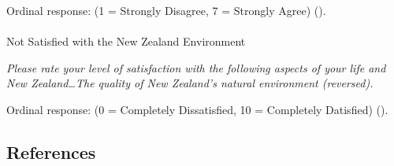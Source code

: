 \documentclass[
  single column]{article}
\makeatletter
\let\oldparagraph\paragraph
\renewcommand{\paragraph}{
    \@ifstar
      \xxxParagraphStar
      \xxxParagraphNoStar
  }
\newcommand{\xxxParagraphStar}[1]{\oldparagraph*{#1}\mbox{}}
\newcommand{\xxxParagraphNoStar}[1]{\oldparagraph{#1}\mbox{}}
\makeatother
\begin{document}
Ordinal response: (1 = Strongly Disagree, 7 = Strongly Agree)
().

\paragraph{Not Satisfied with the New Zealand
Environment}\label{not-satisfied-with-the-new-zealand-environment}

\emph{Please rate your level of satisfaction with the following aspects
of your life and New Zealand\ldots The quality of New Zealand's natural
environment (reversed).}

Ordinal response: (0 = Completely Dissatisfied, 10 = Completely
Datisfied) ().

\newpage{}

\subsection*{References}\label{references}
\end{document}
